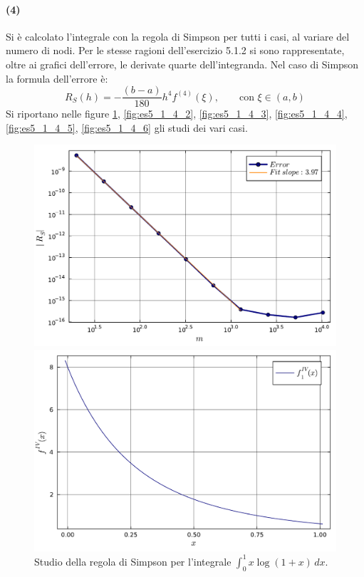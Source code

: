 \documentclass[letterpaper, 12pt]{article}
\numberwithin{equation}{section}    %
\begin{document}
\paragraph{(4)}Si è calcolato l'integrale con la regola di Simpson per tutti i casi, al variare del numero di
nodi. Per le stesse ragioni dell'esercizio 5.1.2 si sono rappresentate, oltre ai grafici dell'errore, 
le derivate quarte dell'integranda. Nel caso di Simpson la formula dell'errore è:
\[
R_S(h) = -\frac{(b-a)}{180}h^4 f^{(4)}(\xi), \qquad \text{con } \xi \in (a, b)
\] 
Si riportano nelle figure \ref{fig:es5_1_4_1}, \ref{fig:es5_1_4_2}, \ref{fig:es5_1_4_3},
\ref{fig:es5_1_4_4}, \ref{fig:es5_1_4_5}, \ref{fig:es5_1_4_6} gli studi dei vari casi.
\begin{figure}[!ht]
    \centering
    \begin{minipage}[b]{0.42\textwidth}
        \includegraphics[width=\textwidth]{5141.pdf}
    \end{minipage}
    \hspace{0.5cm}
    \begin{minipage}[b]{0.42\textwidth}
        \includegraphics[width=\textwidth]{5141_2.pdf}
    \end{minipage}
    \caption{Studio della regola di Simpson per l'integrale $\int_0^1 x\log(1+x)\, dx$.}
    \label{fig:es5_1_4_1}
\end{figure}
\end{document}
